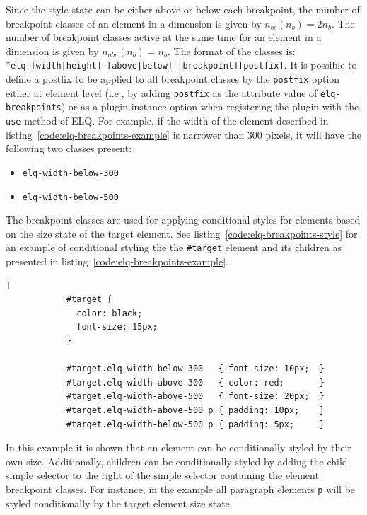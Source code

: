 \documentclass[a4paper,11pt]{kth-mag}
\newcommand{\code}[1]{\texttt{#1}}
\begin{document}
          Since the style state can be either above or below each breakpoint, the number of breakpoint classes of an \gls{element} in a dimension is given by $n_{bc}(n_{b}) = 2n_b$.
          The number of breakpoint classes active at the same time for an \gls{element} in a dimension is given by $n_{abc}(n_{b}) = n_{b}$.
          The format of the classes is: \\*\code{elq-[width|height]-[above|below]-[breakpoint][postfix]}.
          It is possible to define a postfix to be applied to all breakpoint classes by the \code{postfix} option either at \gls{element} level (i.e., by adding \code{postfix} as the attribute value of \code{elq-breakpoints}) or as a plugin instance option when registering the plugin with the \code{use} method of \gls{ELQ}.
          For example, if the width of the \gls{element} described in listing~\ref{code:elq-breakpoints-example} is narrower than 300 pixels, it will have the following two classes present:
          \begin{itemize}
            \item \code{elq-width-below-300}
            \item \code{elq-width-below-500}
          \end{itemize}
          The breakpoint classes are used for applying conditional styles for \glspl{element} based on the size state of the target \gls{element}.
          See listing~\ref{code:elq-breakpoints-style} for an example of conditional styling the the \code{\#target} element and its children as presented in listing~\ref{code:elq-breakpoints-example}.
          \begin{lstlisting}[gobble=12,caption={Example of conditional styles using the \code{elq-breakpoints} plugin classes.},captionpos=b,label={code:elq-breakpoints-style}]]
            #target {
              color: black;
              font-size: 15px;
            }

            #target.elq-width-below-300   { font-size: 10px;  }
            #target.elq-width-above-300   { color: red;       }
            #target.elq-width-above-500   { font-size: 20px;  }
            #target.elq-width-above-500 p { padding: 10px;    }
            #target.elq-width-below-500 p { padding: 5px;     }
          \end{lstlisting}
          In this example it is shown that an element can be conditionally styled by their own size.
          Additionally, children can be conditionally styled by adding the child simple selector to the right of the simple selector containing the element breakpoint classes.
          For instance, in the example all paragraph \glspl{element} \code{p} will be styled conditionally by the target element size state.
\end{document}
